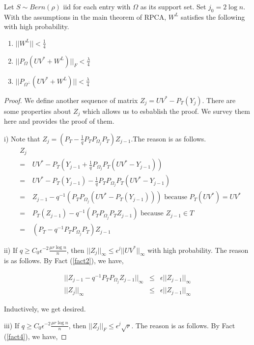 \documentclass{../common/projectreport}
\begin{document}
\begin{thm}
Let $S\sim Bern(\rho)$ iid for each entry with $\Omega$ as its support set. Set $j_{0}=2\log n$. With the assumptions in the main theorem of RPCA, $W^{L}$ satisfies the following with high probability. 
\begin{enumerate}
\item $||W^{L}||<\frac{1}{4}$ 
\item $||P_{\Omega}(UV^{*}+W^{L})||_{F}<\frac{\lambda}{4}$ 
\item $||P_{\Omega^{\bot}}(UV^{*}+W^{L})||<\frac{\lambda}{4}$ 
\end{enumerate}
\end{thm}

\begin{proof}
We define another sequence of matrix $Z_{j}=UV^{*}-P_{T}(Y_{j})$. There are some properties about $Z_{j}$ which allows us to esbablish the proof. We survey them here and provides the proof of them. 

i) Note that $Z_{j}=(P_{T}-\frac{1}{q}P_{T}P_{\Omega_{j}}P_{T})Z_{j-1}.$The reason is as follows.
\begin{eqnarray*}
 & Z_{j}\\
 & = & UV^{*}-P_{T}(Y_{j-1}+\frac{1}{q}P_{\Omega_{j}}P_{T}(UV^{*}-Y_{j-1}))\\
 & = & UV^{*}-P_{T}(Y_{j-1})-\frac{1}{q}P_{T}P_{\Omega_{j}}P_{T}(UV^{*}-Y_{j-1})\\
 & = & Z_{j-1}-q^{-1}(P_{T}P_{\Omega_{j}}(UV^{*}-P_{T}(Y_{j-1})))\text{ because }P_{T}(UV^{*})=UV^{*}\\
 & = & P_{T}(Z_{j-1})-q^{-1}(P_{T}P_{\Omega_{j}}P_{T}Z_{j-1})\text{ because }Z_{j-1}\in T\\
 & = & (P_{T}-q^{-1}P_{T}P_{\Omega_{j}}P_{T})Z_{j-1}
\end{eqnarray*}


ii) If $q\ge C_{0}\epsilon^{-2}\frac{\mu r\log n}{n}$, then $||Z_{j}||_{\infty}\le\epsilon^{j}||UV^{*}||_{\infty}$ with high probability. The reason is as follows. By Fact (\ref{fact2}), we have, 

\begin{eqnarray*}
||Z_{j-1}-q^{-1}P_{T}P_{\Omega_{j}}Z_{j-1}||_{\infty} & \le & \epsilon||Z_{j-1}||_{\infty}\\
||Z_{j}||_{\infty} & \le & \epsilon||Z_{j-1}||_{\infty}
\end{eqnarray*}


Inductively, we get desired.

iii) If $q\ge C_{0}\epsilon^{-2}\frac{\mu r\log n}{n}$, then $||Z_{j}||_{F}\le\epsilon^{j}\sqrt{r}$. The reason is as follows. By Fact (\ref{fact4}), we have, 


\end{proof}
\end{document}
